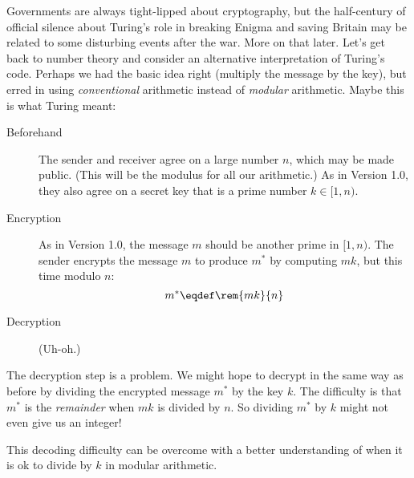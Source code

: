 Governments are always tight-lipped about cryptography, but the
half-century of official silence about Turing's role in breaking
Enigma and saving Britain may be related to some disturbing events
after the war.  More on that later.  Let's get back to number theory
and consider an alternative interpretation of Turing's code.  Perhaps
we had the basic idea right (multiply the message by the key), but
erred in using \emph{conventional} arithmetic instead of
\emph{modular} arithmetic.  Maybe this is what Turing meant:
\begin{description}

\item[Beforehand] The sender and receiver agree on a large number $n$,
  which may be made public.  (This will be the modulus for all our
  arithmetic.)  As in Version 1.0, they also agree on a secret key
  that is a prime number $k \in [1, n)$.

\item[Encryption] As in Version 1.0, the message $m$ should be another
  prime in $[1, n)$.  The sender encrypts the message $m$ to produce
    $m^*$ by computing $mk$, but this time modulo $n$:
\begin{equation}
m^* \eqdef \rem{mk}{n} \label{eq:turing-code}
\end{equation}

\item[Decryption] (Uh-oh.)

\end{description}

The decryption step is a problem.  We might hope to decrypt in the
same way as before by dividing the encrypted message $m^*$ by the key
$k$.  The difficulty is that $m^*$ is the \emph{remainder} when $mk$
is divided by $n$.  So dividing $m^*$ by $k$ might not even give us an
integer!

This decoding difficulty can be overcome with a better understanding
of when it is ok to divide by $k$ in modular arithmetic.

\begin{problems}
\practiceproblems
{}

\homeworkproblems
{}

\classproblems
{}

\examproblems
{}
\end{problems}

